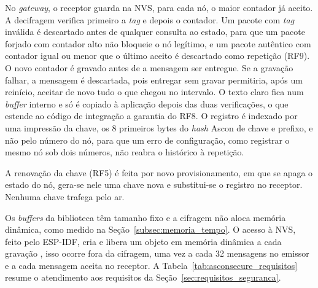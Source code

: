 No \textit{gateway}, o receptor guarda na NVS, para cada nó, o maior contador já aceito. A decifragem verifica primeiro a \textit{tag} e depois o contador. Um pacote com \textit{tag} inválida é descartado antes de qualquer consulta ao estado, para que um pacote forjado com contador alto não bloqueie o nó legítimo, e um pacote autêntico com contador igual ou menor que o último aceito é descartado como repetição (RF9). O novo contador é gravado antes de a mensagem ser entregue. Se a gravação falhar, a mensagem é descartada, pois entregar sem gravar permitiria, após um reinício, aceitar de novo tudo o que chegou no intervalo. O texto claro fica num \textit{buffer} interno e só é copiado à aplicação depois das duas verificações, o que estende ao código de integração a garantia do RF8. O registro é indexado por uma impressão da chave, os 8 primeiros bytes do \textit{hash} Ascon de chave e prefixo, e não pelo número do nó, para que um erro de configuração, como registrar o mesmo nó sob dois números, não reabra o histórico à repetição.

A renovação da chave (RF5) é feita por novo provisionamento, em que se apaga o estado do nó, gera-se nele uma chave nova e substitui-se o registro no receptor. Nenhuma chave trafega pelo ar.

Os \textit{buffers} da biblioteca têm tamanho fixo e a cifragem não aloca memória dinâmica, como medido na Seção~\ref{subsec:memoria_tempo}. O acesso à NVS, feito pelo ESP-IDF, cria e libera um objeto em memória dinâmica a cada gravação \cite{espressif2026idf}, isso ocorre fora da cifragem, uma vez a cada 32 mensagens no emissor e a cada mensagem aceita no receptor. A Tabela~\ref{tab:asconsecure_requisitos} resume o atendimento aos requisitos da Seção~\ref{sec:requisitos_seguranca}.

